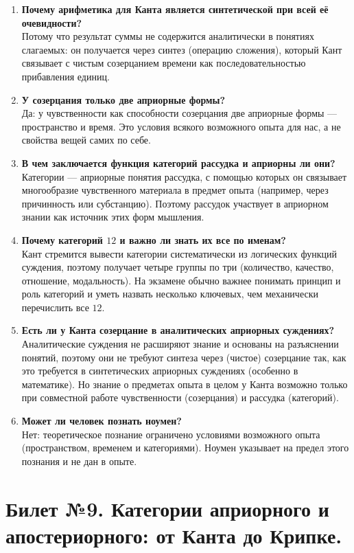 \documentclass[a4paper,12pt]{article}
\begin{document}
\begin{enumerate}
    \item \textbf{Почему арифметика для Канта является синтетической при всей её очевидности?}\\
    Потому что результат суммы не содержится аналитически в понятиях слагаемых: он получается через синтез (операцию сложения), который Кант связывает с чистым созерцанием времени как последовательностью прибавления единиц.
    \item \textbf{У созерцания только две априорные формы?}\\
    Да: у чувственности как способности созерцания две априорные формы — пространство и время. Это условия всякого возможного опыта для нас, а не свойства вещей самих по себе.
    \item \textbf{В чем заключается функция категорий рассудка и априорны ли они?}\\
    Категории — априорные понятия рассудка, с помощью которых он связывает многообразие чувственного материала в предмет опыта (например, через причинность или субстанцию). Поэтому рассудок участвует в априорном знании как источник этих форм мышления.
    \item \textbf{Почему категорий $12$ и важно ли знать их все по именам?}\\
    Кант стремится вывести категории систематически из логических функций суждения, поэтому получает четыре группы по три (количество, качество, отношение, модальность). На экзамене обычно важнее понимать принцип и роль категорий и уметь назвать несколько ключевых, чем механически перечислить все $12$.
    \item \textbf{Есть ли у Канта созерцание в аналитических априорных суждениях?}\\
    Аналитические суждения не расширяют знание и основаны на разъяснении понятий, поэтому они не требуют синтеза через (чистое) созерцание так, как это требуется в синтетических априорных суждениях (особенно в математике). Но знание о предметах опыта в целом у Канта возможно только при совместной работе чувственности (созерцания) и рассудка (категорий).
    \item \textbf{Может ли человек познать ноумен?}\\
    Нет: теоретическое познание ограничено условиями возможного опыта (пространством, временем и категориями). Ноумен указывает на предел этого познания и не дан в опыте.
\end{enumerate}


\newpage
\section{Билет №9. Категории априорного и апостериорного: от Канта до Крипке.}
\end{document}
